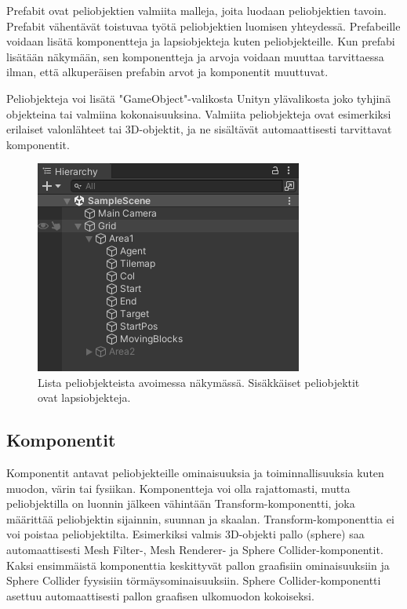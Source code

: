 \documentclass[utf8]{gradu3}
\begin{document}
Prefabit ovat peliobjektien valmiita malleja, joita luodaan peliobjektien tavoin. Prefabit vähentävät toistuvaa työtä peliobjektien luomisen yhteydessä. Prefabeille voidaan lisätä komponentteja ja lapsiobjekteja kuten peliobjekteille. Kun prefabi lisätään näkymään, sen komponentteja ja arvoja voidaan muuttaa tarvittaessa ilman, että alkuperäisen prefabin arvot ja komponentit muuttuvat.

Peliobjekteja voi lisätä "GameObject"-valikosta Unityn ylävalikosta joko tyhjinä objekteina tai valmiina kokonaisuuksina. Valmiita peliobjekteja ovat esimerkiksi erilaiset valonlähteet tai 3D-objektit, ja ne sisältävät automaattisesti tarvittavat komponentit.

\begin{figure}[h]
\centering
\includegraphics[width=8.8cm]{peliobjektilistaus.png}
\caption{Lista peliobjekteista avoimessa näkymässä. Sisäkkäiset peliobjektit ovat lapsiobjekteja.}
\label{peliobjektikuva}
\end{figure}

\subsection{Komponentit}

Komponentit antavat peliobjekteille ominaisuuksia ja toiminnallisuuksia kuten muodon, värin tai fysiikan. Komponentteja voi olla rajattomasti, mutta peliobjektilla on luonnin jälkeen vähintään Transform-komponentti, joka määrittää peliobjektin sijainnin, suunnan ja skaalan. Transform-komponenttia ei voi poistaa peliobjektilta. Esimerkiksi valmis 3D-objekti pallo (sphere) saa automaattisesti Mesh Filter-, Mesh Renderer- ja Sphere Collider-komponentit. Kaksi ensimmäistä komponenttia keskittyvät pallon graafisiin ominaisuuksiin ja Sphere Collider fyysisiin törmäysominaisuuksiin. Sphere Collider-komponentti asettuu automaattisesti pallon graafisen ulkomuodon kokoiseksi.
\end{document}

